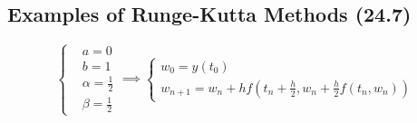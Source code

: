 \documentclass[12pt]{article}
\begin{document}
\subsection{Examples of Runge-Kutta Methods (24.7)}
\begin{equation*}
  \boxed{\begin{cases}
     & a = 0\\
     & b=1\\
     & \alpha = \frac{1}{2}\\
     & \beta = \frac{1}{2}
    \end{cases}
    \implies 
    \begin{cases}
      w_0 = y(t_0) \\
      w_{n+1} = w_n + h f(t_n + \frac{h}{2}, w_n + \frac{h}{2}f(t_n, w_n)) 
  \end{cases}}
\end{equation*}
\end{document}
